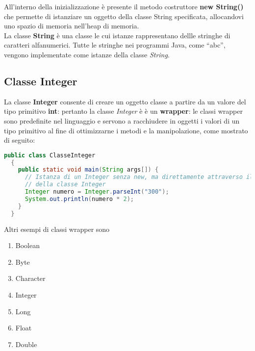 \documentclass[a4paper]{extarticle}
\newcommand{\quotes}[1]{``#1''}
\begin{document}
\noindent
All'interno della inizializzazione è presente il metodo costruttore \textbf{new String()} che permette di istanziare un oggetto della classe String specificata, allocandovi uno spazio di memoria nell'heap di memoria.\\
La classe \textbf{String} è una classe le cui istanze rappresentano dellle stringhe di caratteri alfanumerici. Tutte le stringhe nei programmi Java, come \quotes{abc}, vengono implementate come istanze della classe \emph{String}.

\vspace{1em}
\subsection{Classe Integer}
La classe \textbf{Integer} consente di creare un oggetto classe a partire da un valore del tipo primitivo \textbf{int}: pertanto la classe \emph{Integer} è è un \textbf{wrapper}: le classi wrapper sono predefinite nel linguaggio e servono a racchiudere in oggetti i valori di un tipo primitivo al fine di ottimizzarne i metodi e la manipolazione, come mostrato di seguito:

\vspace{1em}
\noindent
\begin{lstlisting}[language=Java, caption=Classe Integer in Java]
  public class ClasseInteger
  {
    public static void main(String args[]) {
      // Istanza di un Integer senza new, ma direttamente attraverso il metodo
      // della classe Integer
      Integer numero = Integer.parseInt("300");
      System.out.println(numero * 2);
    }
  }
\end{lstlisting}
\vspace{1em}

\noindent
Altri esempi di classi wrapper sono
\begin{enumerate}
  \item Boolean
  \item Byte
  \item Character
  \item Integer
  \item Long
  \item Float
  \item Double
\end{enumerate}

\vspace{1em}
\end{document}
